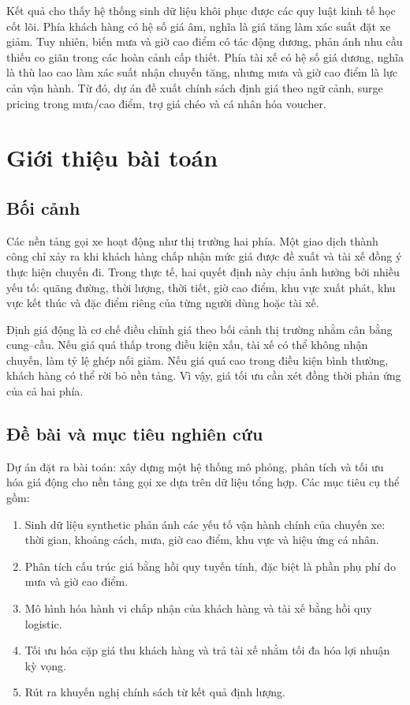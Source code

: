 \documentclass[12pt,a4paper]{report}
\begin{document}
Kết quả cho thấy hệ thống sinh dữ liệu khôi phục được các quy luật kinh tế học cốt lõi. Phía khách hàng có hệ số giá âm, nghĩa là giá tăng làm xác suất đặt xe giảm. Tuy nhiên, biến mưa và giờ cao điểm có tác động dương, phản ánh nhu cầu thiếu co giãn trong các hoàn cảnh cấp thiết. Phía tài xế có hệ số giá dương, nghĩa là thù lao cao làm xác suất nhận chuyến tăng, nhưng mưa và giờ cao điểm là lực cản vận hành. Từ đó, dự án đề xuất chính sách định giá theo ngữ cảnh, surge pricing trong mưa/cao điểm, trợ giá chéo và cá nhân hóa voucher.

\chapter{Giới thiệu bài toán}

\section{Bối cảnh}

Các nền tảng gọi xe hoạt động như thị trường hai phía. Một giao dịch thành công chỉ xảy ra khi khách hàng chấp nhận mức giá được đề xuất và tài xế đồng ý thực hiện chuyến đi. Trong thực tế, hai quyết định này chịu ảnh hưởng bởi nhiều yếu tố: quãng đường, thời lượng, thời tiết, giờ cao điểm, khu vực xuất phát, khu vực kết thúc và đặc điểm riêng của từng người dùng hoặc tài xế.

Định giá động là cơ chế điều chỉnh giá theo bối cảnh thị trường nhằm cân bằng cung--cầu. Nếu giá quá thấp trong điều kiện xấu, tài xế có thể không nhận chuyến, làm tỷ lệ ghép nối giảm. Nếu giá quá cao trong điều kiện bình thường, khách hàng có thể rời bỏ nền tảng. Vì vậy, giá tối ưu cần xét đồng thời phản ứng của cả hai phía.

\section{Đề bài và mục tiêu nghiên cứu}

Dự án đặt ra bài toán: xây dựng một hệ thống mô phỏng, phân tích và tối ưu hóa giá động cho nền tảng gọi xe dựa trên dữ liệu tổng hợp. Các mục tiêu cụ thể gồm:

\begin{enumerate}
    \item Sinh dữ liệu synthetic phản ánh các yếu tố vận hành chính của chuyến xe: thời gian, khoảng cách, mưa, giờ cao điểm, khu vực và hiệu ứng cá nhân.
    \item Phân tích cấu trúc giá bằng hồi quy tuyến tính, đặc biệt là phần phụ phí do mưa và giờ cao điểm.
    \item Mô hình hóa hành vi chấp nhận của khách hàng và tài xế bằng hồi quy logistic.
    \item Tối ưu hóa cặp giá thu khách hàng và trả tài xế nhằm tối đa hóa lợi nhuận kỳ vọng.
    \item Rút ra khuyến nghị chính sách từ kết quả định lượng.
\end{enumerate}
\end{document}
